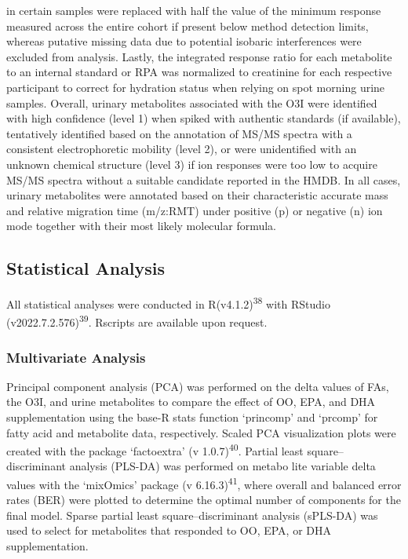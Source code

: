 \documentclass[journal=jacsat,manuscript=article]{achemso}
\begin{document}
in certain samples were replaced with half the value of the minimum
response measured across the entire cohort if present below method
detection limits, whereas putative missing data due to potential
isobaric interferences were excluded from analysis. Lastly, the
integrated response ratio for each metabolite to an internal standard or
RPA was normalized to creatinine for each respective participant to
correct for hydration status when relying on spot morning urine samples.
Overall, urinary metabolites associated with the O3I were identified
with high confidence (level 1) when spiked with authentic standards (if
available), tentatively identified based on the annotation of MS/MS
spectra with a consistent electrophoretic mobility (level 2), or were
unidentified with an unknown chemical structure (level 3) if ion
responses were too low to acquire MS/MS spectra without a suitable
candidate reported in the HMDB. In all cases, urinary metabolites were
annotated based on their characteristic accurate mass and relative
migration time (m/z:RMT) under positive (p) or negative (n) ion mode
together with their most likely molecular formula.

\subsection{Statistical Analysis}\label{statistical-analysis}

All statistical analyses were conducted in R(v4.1.2)\textsuperscript{38}
with RStudio (v2022.7.2.576)\textsuperscript{39}. Rscripts are available
upon request.

\subsubsection{Multivariate Analysis}\label{multivariate-analysis}

Principal component analysis (PCA) was performed on the delta values of
FAs, the O3I, and urine metabolites to compare the effect of OO, EPA,
and DHA supplementation using the base-R stats function `princomp' and
`prcomp' for fatty acid and metabolite data, respectively. Scaled PCA
visualization plots were created with the package `factoextra' (v
1.0.7)\textsuperscript{40}. Partial least square--discriminant analysis
(PLS-DA) was performed on metabo lite variable delta values with the
`mixOmics' package (v 6.16.3)\textsuperscript{41}, where overall and
balanced error rates (BER) were plotted to determine the optimal number
of components for the final model. Sparse partial least
square--discriminant analysis (sPLS-DA) was used to select for
metabolites that responded to OO, EPA, or DHA supplementation.
\end{document}
